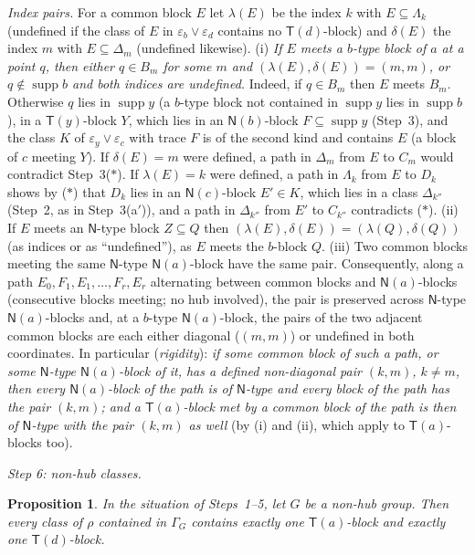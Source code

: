 \documentclass[11pt]{amsart}
\newtheorem{proposition}[theorem]{Proposition}
\theoremstyle{definition}
\newcommand{\supp}{\operatorname{supp}}
\newcommand{\T}{\mathsf{T}}
\newcommand{\N}{\mathsf{N}}
\begin{document}
\emph{Index pairs.} For a common block $E$ let $\lambda(E)$ be the index $k$ with $E\subseteq\Lambda_k$ (undefined if the class of $E$ in $\varepsilon_b\vee\varepsilon_d$ contains no $\T(d)$-block) and $\delta(E)$ the index $m$ with $E\subseteq\Delta_m$ (undefined likewise). (i) \emph{If $E$ meets a $b$-type block of $a$ at a point $q$, then either $q\in B_m$ for some $m$ and $(\lambda(E),\delta(E))=(m,m)$, or $q\notin\supp b$ and both indices are undefined.} Indeed, if $q\in B_m$ then $E$ meets $B_m$. Otherwise $q$ lies in $\supp y$ (a $b$-type block not contained in $\supp y$ lies in $\supp b$), in a $\T(y)$-block $Y$, which lies in an $\N(b)$-block $F\subseteq\supp y$ (Step~3), and the class $K$ of $\varepsilon_y\vee\varepsilon_c$ with trace $F$ is of the second kind and contains $E$ (a block of $c$ meeting $Y$). If $\delta(E)=m$ were defined, a path in $\Delta_m$ from $E$ to $C_m$ would contradict Step~3($*$). If $\lambda(E)=k$ were defined, a path in $\Lambda_k$ from $E$ to $D_k$ shows by ($*$) that $D_k$ lies in an $\N(c)$-block $E'\in K$, which lies in a class $\Delta_{k''}$ (Step~2, as in Step~3(a$'$)), and a path in $\Delta_{k''}$ from $E'$ to $C_{k''}$ contradicts ($*$). (ii) If $E$ meets an $\N$-type block $Z\subseteq Q$ then $(\lambda(E),\delta(E))=(\lambda(Q),\delta(Q))$ (as indices or as ``undefined''), as $E$ meets the $b$-block $Q$. (iii) Two common blocks meeting the same $\N$-type $\N(a)$-block have the same pair. Consequently, along a path $E_0,F_1,E_1,\dots,F_r,E_r$ alternating between common blocks and $\N(a)$-blocks (consecutive blocks meeting; no hub involved), the pair is preserved across $\N$-type $\N(a)$-blocks and, at a $b$-type $\N(a)$-block, the pairs of the two adjacent common blocks are each either diagonal ($(m,m)$) or undefined in both coordinates. In particular (\emph{rigidity}): \emph{if some common block of such a path, or some $\N$-type $\N(a)$-block of it, has a defined non-diagonal pair $(k,m)$, $k\ne m$, then every $\N(a)$-block of the path is of $\N$-type and every block of the path has the pair $(k,m)$; and a $\T(a)$-block met by a common block of the path is then of $\N$-type with the pair $(k,m)$ as well} (by (i) and (ii), which apply to $\T(a)$-blocks too).

\smallskip
\emph{Step 6: non-hub classes.}

\begin{proposition}\label{prop:Qnh}
In the situation of Steps~\textup{1--5}, let $G$ be a non-hub group. Then every class of $\rho$ contained in $\Gamma_G$ contains exactly one $\T(a)$-block and exactly one $\T(d)$-block.
\end{proposition}
\end{document}
